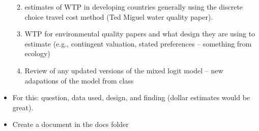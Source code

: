 \documentclass[
  letterpaper,
]{article}
\providecommand{\tightlist}{%
  \setlength{\itemsep}{0pt}\setlength{\parskip}{0pt}}\usepackage{longtable,booktabs,array}
\begin{document}
\begin{tcolorbox}
\begin{itemize}
  \begin{enumerate}
  \def\labelenumi{\arabic{enumi}.}
  \tightlist
  \item
    estimates of WTP in developing countries generally using the
    discrete choice travel cost method (Ted Miguel water quality paper).
  \item
    WTP for environmental quality papers and what design they are using
    to estimate (e.g., contingent valuation, stated preferences --
    something from ecology)
  \item
    Review of any updated versions of the mixed logit model -- new
    adapations of the model from class
  \end{enumerate}
\item
  For this: question, data used, design, and finding (dollar estimates
  would be great).
\item
  Create a document in the docs folder
\end{itemize}

\end{tcolorbox}
\end{document}
